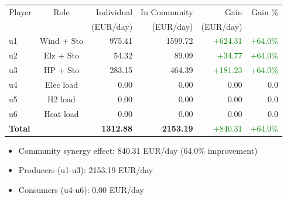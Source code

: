 \begin{frame}
    \begin{table}[h]
    \centering
    \small
    \begin{tabular}{l|c|r|r|r|r}
    \toprule
    Player & Role & Individual & In Community & Gain & Gain \% \\
        &      & (EUR/day) & (EUR/day) & (EUR/day) & \\
    \midrule
    u1 & Wind + Sto & 975.41 & 1599.72 & \textcolor{green}{+624.31} & \textcolor{green}{+64.0\%} \\
u2 & Elz + Sto & 54.32 & 89.09 & \textcolor{green}{+34.77} & \textcolor{green}{+64.0\%} \\
u3 & HP + Sto & 283.15 & 464.39 & \textcolor{green}{+181.23} & \textcolor{green}{+64.0\%} \\
u4 & Elec load & 0.00 & 0.00 & 0.00 & 0.0 \\
u5 & H2 load & 0.00 & 0.00 & 0.00 & 0.0 \\
u6 & Heat load & 0.00 & 0.00 & 0.00 & 0.0 \\
\midrule
    \textbf{Total} & & \textbf{1312.88} & \textbf{2153.19} & \textcolor{green}{+840.31} & \textcolor{green}{+64.0\%} \\
    \bottomrule
    \end{tabular}
    \end{table}

    \vspace{0.5em}
    \begin{itemize}
    \item Community synergy effect: 840.31 EUR/day (64.0\% improvement)
    \item Producers (u1-u3): 2153.19 EUR/day
    \item Consumers (u4-u6): 0.00 EUR/day
    \end{itemize}
    \end{frame}